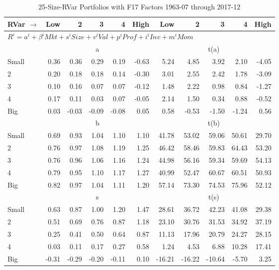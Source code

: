 
\begin{table}[!ht]
\footnotesize
\centering
\caption{25-Size-RVar Portfolios with F17 Factors 1963-07 through 2017-12}
\begin{tabular}{lrrrrrrrrrr}
  \toprule
    
    RVar $\rightarrow$ & Low & 2 & 3 & 4 & High & Low & 2 & 3 & 4 & High  \\ 
  \midrule
  \multicolumn{11}{l}{$R^i=a^i+\beta^iMkt+s^iSize+v^iVal+p^iProf+i^iInv+m^iMom$}  \\
  
     & \multicolumn{5}{c}{a} & \multicolumn{5}{c}{t(a)}   \\
     \cmidrule(r){2-6} \cmidrule(r){7-11} 
    Small  & 0.36  & 0.36  & 0.29  & 0.19  & -0.63  & 5.24  & 4.85  & 3.92  & 2.10  & -4.05   \\
    2  & 0.20  & 0.18  & 0.18  & 0.14  & -0.30  & 3.01  & 2.55  & 2.42  & 1.78  & -3.09   \\
    3  & 0.10  & 0.16  & 0.07  & 0.07  & -0.12  & 1.48  & 2.22  & 0.98  & 0.84  & -1.27   \\
    4  & 0.17  & 0.11  & 0.03  & 0.07  & -0.05  & 2.14  & 1.50  & 0.34  & 0.88  & -0.52   \\
    Big  & 0.03  & -0.03  & -0.09  & -0.08  & 0.05  & 0.58  & -0.53  & -1.50  & -1.24  & 0.56   \\
    
  
     & \multicolumn{5}{c}{b} & \multicolumn{5}{c}{t(b)}   \\
     \cmidrule(r){2-6} \cmidrule(r){7-11} 
    Small  & 0.69  & 0.93  & 1.04  & 1.10  & 1.10  & 41.78  & 53.02  & 59.06  & 50.61  & 29.70   \\
    2  & 0.76  & 0.97  & 1.08  & 1.19  & 1.25  & 46.42  & 58.46  & 59.83  & 64.43  & 53.20   \\
    3  & 0.76  & 0.96  & 1.06  & 1.16  & 1.24  & 44.98  & 56.16  & 59.34  & 59.69  & 54.13   \\
    4  & 0.79  & 0.95  & 1.10  & 1.17  & 1.27  & 40.99  & 52.47  & 60.67  & 60.51  & 50.93   \\
    Big  & 0.82  & 0.97  & 1.04  & 1.11  & 1.20  & 57.14  & 73.30  & 74.53  & 75.96  & 52.12   \\
    
  
     & \multicolumn{5}{c}{s} & \multicolumn{5}{c}{t(s)}   \\
     \cmidrule(r){2-6} \cmidrule(r){7-11} 
    Small  & 0.63  & 0.87  & 1.00  & 1.20  & 1.47  & 28.61  & 36.72  & 42.23  & 41.08  & 29.38   \\
    2  & 0.51  & 0.69  & 0.76  & 0.87  & 1.18  & 23.10  & 30.76  & 31.53  & 34.92  & 37.19   \\
    3  & 0.25  & 0.41  & 0.50  & 0.64  & 0.87  & 11.13  & 17.96  & 20.79  & 24.27  & 28.15   \\
    4  & 0.03  & 0.11  & 0.17  & 0.27  & 0.58  & 1.24  & 4.53  & 6.88  & 10.28  & 17.41   \\
    Big  & -0.31  & -0.29  & -0.20  & -0.11  & 0.10  & -16.21  & -16.22  & -10.64  & -5.70  & 3.25   \\
    

\end{tabular}
\end{table}
